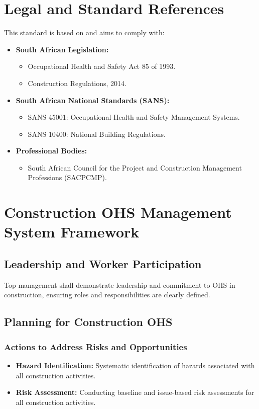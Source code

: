 \documentclass[11pt]{article}
\begin{document}
\section{Legal and Standard References}
This standard is based on and aims to comply with:
\begin{itemize}
    \item \textbf{South African Legislation:}
    \begin{itemize}
        \item Occupational Health and Safety Act 85 of 1993.
        \item Construction Regulations, 2014.
    \end{itemize}
    \item \textbf{South African National Standards (SANS):}
    \begin{itemize}
        \item SANS 45001: Occupational Health and Safety Management Systems.
        \item SANS 10400: National Building Regulations.
    \end{itemize}
    \item \textbf{Professional Bodies:}
    \begin{itemize}
        \item South African Council for the Project and Construction Management Professions (SACPCMP).
    \end{itemize}
\end{itemize}

\section{Construction OHS Management System Framework}

\subsection{Leadership and Worker Participation}
Top management shall demonstrate leadership and commitment to OHS in construction, ensuring roles and responsibilities are clearly defined.

\subsection{Planning for Construction OHS}

\subsubsection{Actions to Address Risks and Opportunities}
\begin{itemize}
    \item \textbf{Hazard Identification:} Systematic identification of hazards associated with all construction activities.
    \item \textbf{Risk Assessment:} Conducting baseline and issue-based risk assessments for all construction activities.
\end{itemize}
\end{document}

